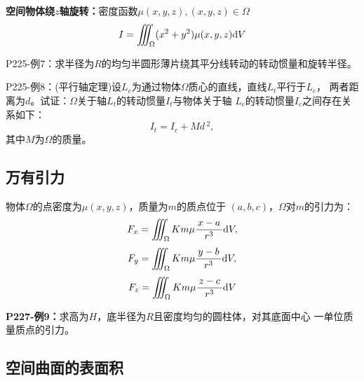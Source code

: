 {\bf 空间物体绕$z$轴旋转：}密度函数$\mu(x,y,z),(x,y,z)\in\Omega$
$${I=\iiint_{\Omega}(x^2+y^2)\mu(x,y,z)\mathrm{d} V}$$

{P225-例7：}求半径为$R$的均匀半圆形薄片绕其平分线转动的转动惯量和旋转半径。

{P225-例8：}(平行轴定理)设$L_c$为通过物体$\Omega$质心的直线，直线$L_t$平行于$L_c$，
两者距离为$d$。试证：$\Omega$关于轴$L_t$的转动惯量$I_t$与物体关于轴
$L_c$的转动惯量$I_c$之间存在关系如下：
$$I_t=I_c+Md\,^2,$$
其中$M$为$\Omega$的质量。

\subsection{万有引力}

物体$\Omega$的点密度为$\mu(x,y,z)$，质量为$m$的质点位于
$(a,b,c)$，$\Omega$对$m$的引力为：
$${F_x=\iiint_{\Omega}Km\mu\displaystyle\frac{\,{x-a}\,}{\,{r^3}\,}\mathrm{d} V,} $$
$${F_y=\iiint_{\Omega}Km\mu\displaystyle\frac{\,{y-b}\,}{\,{r^3}\,}\mathrm{d} V,} $$
$${F_z=\iiint_{\Omega}Km\mu\displaystyle\frac{\,{z-c}\,}{\,{r^3}\,}\mathrm{d} V} $$

{\bf P227-例9：}求高为$H$，底半径为$R$且密度均匀的圆柱体，对其底面中心
一单位质量质点的引力。

\begin{center}
\end{center}

\subsection{空间曲面的表面积}

